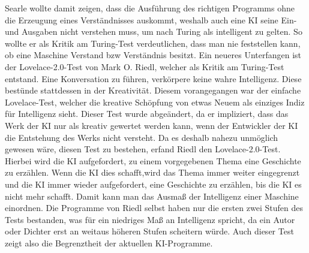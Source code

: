 Searle wollte damit zeigen, dass die Ausführung des richtigen Programms ohne die Erzeugung eines Verständnisses auskommt, weshalb auch eine KI seine Ein- und Ausgaben nicht verstehen muss, um nach Turing als intelligent zu gelten.
So wollte er als Kritik am Turing-Test verdeutlichen, dass man nie feststellen kann, ob eine Maschine Verstand bzw Verständnis besitzt.
Ein neueres Unterfangen ist der Lovelace-2.0-Test von Mark O.
Riedl, welcher als Kritik am Turing-Test entstand.
Eine Konversation zu führen, verkörpere keine wahre Intelligenz.
Diese bestünde stattdessen in der Kreativität.
Diesem vorangegangen war der einfache Lovelace-Test, welcher die kreative Schöpfung von etwas Neuem als einziges Indiz für Intelligenz sieht.
Dieser Test wurde abgeändert, da er impliziert, dass das Werk der KI nur als kreativ gewertet werden kann, wenn der Entwickler der KI die Entstehung des Werks nicht versteht.
Da es deshalb nahezu unmöglich gewesen wäre, diesen Test zu bestehen, erfand Riedl den Lovelace-2.0-Test.
Hierbei wird die KI aufgefordert, zu einem vorgegebenen Thema eine Geschichte zu erzählen.
Wenn die KI dies schafft,wird das Thema immer weiter eingegrenzt und die KI immer wieder aufgefordert, eine Geschichte zu erzählen, bis die KI es nicht mehr schafft.
Damit kann man das Ausmaß der Intelligenz einer Maschine einordnen.
Die Programme von Riedl selbst haben nur die ersten zwei Stufen des Tests bestanden, was für ein niedriges Maß an Intelligenz spricht, da ein Autor oder Dichter erst an weitaus höheren Stufen scheitern würde.
Auch dieser Test zeigt also die Begrenztheit der aktuellen KI-Programme.

